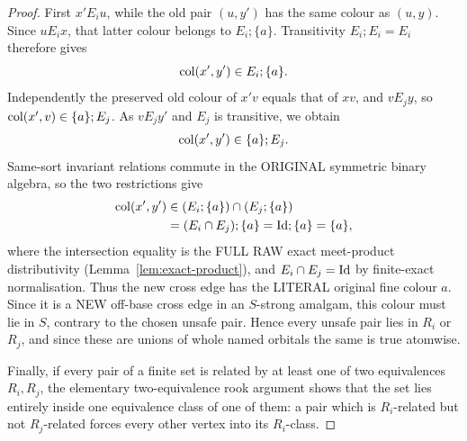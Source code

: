 \begin{proof}
First \(x'E_i u\), while the old
pair \((u,y')\) has the same
colour as \((u,y)\).
Since \(uE_i x\), that latter
colour belongs to \(E_i;\{a\}\).
Transitivity \(E_i;E_i=E_i\)
therefore gives
\[
        \operatorname{col}(x',y')\in E_i;\{a\}.
\]
Independently the preserved
old colour of \(x'v\) equals
that of \(xv\), and \(vE_j y\),
so \(\operatorname{col}(x',v)\in\{a\};E_j\).
As \(vE_j y'\) and \(E_j\)
is transitive, we obtain
\[
        \operatorname{col}(x',y')\in\{a\};E_j.
\]
Same-sort invariant relations
commute in the ORIGINAL
symmetric binary algebra, so
the two restrictions give
\[
 \begin{aligned}
 \operatorname{col}(x',y')&
 \in (E_i;\{a\})\cap(E_j;\{a\})\\
 &=(E_i\cap E_j);\{a\}
   =\mathrm{Id};\{a\}=\{a\},
 \end{aligned}
\]
where the intersection equality
is the FULL RAW exact meet-product
distributivity
(Lemma~\ref{lem:exact-product}),
and \(E_i\cap E_j=\mathrm{Id}\)
by finite-exact normalisation.
Thus the new cross edge has the
LITERAL original fine colour \(a\).
Since it is a NEW off-base
cross edge in an \(S\)-strong
amalgam, this colour must lie in
\(S\), contrary to the chosen
unsafe pair.  Hence every unsafe pair lies in
\(R_i\) or \(R_j\), and since these are unions of whole named
orbitals the same is true atomwise.

Finally, if every pair of a finite set is related by at least
one of two equivalences \(R_i,R_j\), the elementary
two-equivalence rook argument shows that the set lies
entirely inside one equivalence class of one of them:
a pair which is \(R_i\)-related but not \(R_j\)-related
forces every other vertex into its \(R_i\)-class.
\end{proof}


